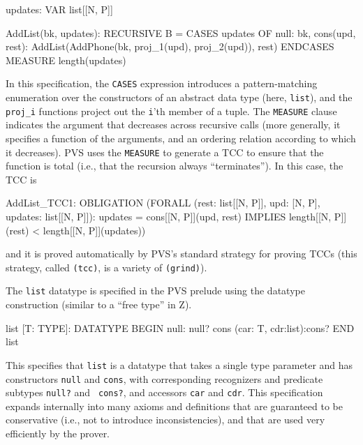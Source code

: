 \begin{jmrsession}
  updates: VAR list[[N, P]]

  AddList(bk, updates): RECURSIVE B = 
    CASES updates OF
      null: bk,
      cons(upd, rest): AddList(AddPhone(bk, proj_1(upd), proj_2(upd)), rest)
    ENDCASES
    MEASURE length(updates)
\end{jmrsession}

In this specification, the {\tt CASES} expression introduces a
pattern-matching enumeration over the constructors of an abstract data
type (here, {\tt list}), and the {\tt proj\_i} functions project out
the {\tt i}'th member of a tuple.  The {\tt MEASURE} clause indicates
the argument that decreases across recursive calls (more generally, it
specifies a function of the arguments, and an ordering relation
according to which it decreases).  PVS uses the {\tt MEASURE} to
generate a TCC to ensure that the function is total (i.e., that the
recursion always ``terminates'').  In this case, the TCC is
\begin{jmrsession}

  AddList_TCC1: OBLIGATION
      (FORALL (rest: list[[N, P]], upd: [N, P], updates: list[[N, P]]):
         updates = cons[[N, P]](upd, rest)
           IMPLIES length[[N, P]](rest) < length[[N, P]](updates))
\end{jmrsession}
and it is proved automatically by PVS's standard strategy for proving
TCCs (this strategy, called {\tt (tcc)}, is a variety of {\tt (grind)}).

The {\tt list} datatype is specified in the PVS prelude using the
datatype construction (similar to a ``free type'' in Z).
\begin{jmrsession}
list [T: TYPE]: DATATYPE 
 BEGIN
  null: null?
  cons (car: T, cdr:list):cons?
 END list
\end{jmrsession}
This specifies that {\tt list} is a datatype that takes a single type
parameter and has constructors {\tt null} and {\tt cons}, with
corresponding recognizers and predicate subtypes {\tt null?} and {\tt
cons?}, and accessors {\tt car} and {\tt cdr}.  This specification
expands internally into many axioms and definitions that are
guaranteed to be conservative (i.e., not to introduce
inconsistencies), and that are used very efficiently by the prover.

